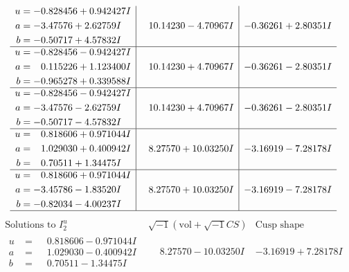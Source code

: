 \documentclass[1p]{elsarticle_modified}
\theoremstyle{definition}
\newcommand{\I}{\sqrt{-1}}
\begin{document}
$$\begin{array}{c|c|c}
\begin{aligned}
u &= -0.828456 + 0.942427 I \\
a &= -3.47576 + 2.62759 I \\
b &= -0.50717 + 4.57832 I\end{aligned}
 & \phantom{-}10.14230 - 4.70967 I & -0.36261 + 2.80351 I \\ \hline\begin{aligned}
u &= -0.828456 - 0.942427 I \\
a &= \phantom{-}0.115226 + 1.123400 I \\
b &= -0.965278 + 0.339588 I\end{aligned}
 & \phantom{-}10.14230 + 4.70967 I & -0.36261 - 2.80351 I \\ \hline\begin{aligned}
u &= -0.828456 - 0.942427 I \\
a &= -3.47576 - 2.62759 I \\
b &= -0.50717 - 4.57832 I\end{aligned}
 & \phantom{-}10.14230 + 4.70967 I & -0.36261 - 2.80351 I \\ \hline\begin{aligned}
u &= \phantom{-}0.818606 + 0.971044 I \\
a &= \phantom{-}1.029030 + 0.400942 I \\
b &= \phantom{-}0.70511 + 1.34475 I\end{aligned}
 & \phantom{-}8.27570 + 10.03250 I & -3.16919 - 7.28178 I \\ \hline\begin{aligned}
u &= \phantom{-}0.818606 + 0.971044 I \\
a &= -3.45786 - 1.83520 I \\
b &= -0.82034 - 4.00237 I\end{aligned}
 & \phantom{-}8.27570 + 10.03250 I & -3.16919 - 7.28178 I\\
 \hline 
 \end{array}$$\newpage$$\begin{array}{c|c|c}  
\text{Solutions to }I^u_{2}& \I (\text{vol} + \sqrt{-1}CS) & \text{Cusp shape}\\
 \hline 
\begin{aligned}
u &= \phantom{-}0.818606 - 0.971044 I \\
a &= \phantom{-}1.029030 - 0.400942 I \\
b &= \phantom{-}0.70511 - 1.34475 I\end{aligned}
 & \phantom{-}8.27570 - 10.03250 I & -3.16919 + 7.28178 I \\ \hline\begin{aligned}

\end{aligned}
\end{array}$$
\end{document}
